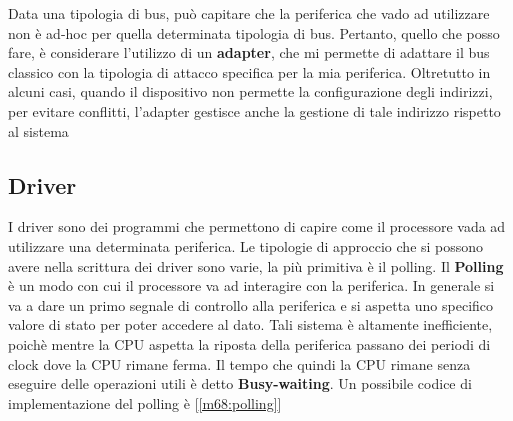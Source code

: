 Data una tipologia di bus, può capitare che la periferica che vado ad utilizzare non è ad-hoc per quella determinata tipologia di bus. Pertanto, quello che posso fare, è considerare l'utilizzo di un \textbf{adapter}, che mi permette di adattare il bus classico con la tipologia di attacco specifica per la mia periferica. Oltretutto in alcuni casi, quando il dispositivo non permette la configurazione degli indirizzi, per evitare conflitti, l'adapter gestisce anche la gestione di tale indirizzo rispetto al sistema

\subsection{Driver}
I driver sono dei programmi che permettono di capire come il processore vada ad utilizzare una determinata periferica.
Le tipologie di approccio che si possono avere nella scrittura dei driver sono varie, la più primitiva è il polling.
Il \textbf{Polling} è un modo con cui il processore va ad interagire con la periferica. In generale si va a dare un primo segnale di controllo alla periferica e si aspetta uno specifico valore di stato per poter accedere al dato. Tali sistema è altamente inefficiente, poichè mentre la CPU aspetta la riposta della periferica passano dei periodi di clock dove la CPU rimane ferma. Il tempo che quindi la CPU rimane senza eseguire delle operazioni utili è detto \textbf{Busy-waiting}. Un possibile codice di implementazione del polling è [\ref{m68:polling}]

